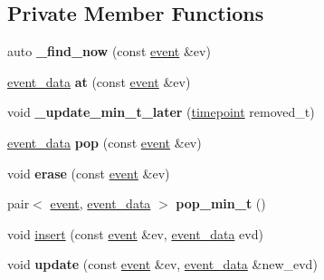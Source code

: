 \subsection*{Private Member Functions}
\begin{DoxyCompactItemize}
\item 
\mbox{\label{classschedule__t_acdc4eb553d3b3d32370e481e09648f91}} 
auto {\bfseries \+\_\+find\+\_\+now} (const \hyperlink{structtricl_1_1event}{event} \&ev)
\item 
\mbox{\label{classschedule__t_a985f7458ec7678df8ce215a6b62b4053}} 
\hyperlink{structtricl_1_1event__data}{event\+\_\+data} {\bfseries at} (const \hyperlink{structtricl_1_1event}{event} \&ev)
\item 
\mbox{\label{classschedule__t_a94dab3fd361972d4d3fd1ca5f1bc1ba1}} 
void {\bfseries \+\_\+update\+\_\+min\+\_\+t\+\_\+later} (\hyperlink{namespacetricl_a720ff6a29f998e11e1d3622fc8df64b1}{timepoint} removed\+\_\+t)
\item 
\mbox{\label{classschedule__t_a2f13d5051ff82db3127c7724bfdd84fa}} 
\hyperlink{structtricl_1_1event__data}{event\+\_\+data} {\bfseries pop} (const \hyperlink{structtricl_1_1event}{event} \&ev)
\item 
\mbox{\label{classschedule__t_ae0ef4c8aff56a3e48aa03289064eb0b8}} 
void {\bfseries erase} (const \hyperlink{structtricl_1_1event}{event} \&ev)
\item 
\mbox{\label{classschedule__t_abf71e35ffdc8ef4e9d63d371532a3444}} 
pair$<$ \hyperlink{structtricl_1_1event}{event}, \hyperlink{structtricl_1_1event__data}{event\+\_\+data} $>$ {\bfseries pop\+\_\+min\+\_\+t} ()
\item 
void \hyperlink{classschedule__t_ac103ad35f9b65078b79746a504f82287}{insert} (const \hyperlink{structtricl_1_1event}{event} \&ev, \hyperlink{structtricl_1_1event__data}{event\+\_\+data} evd)
\item 
\mbox{\label{classschedule__t_a1e2fab403a79b617d5db6f0d30c8e0af}} 
void {\bfseries update} (const \hyperlink{structtricl_1_1event}{event} \&ev, \hyperlink{structtricl_1_1event__data}{event\+\_\+data} \&new\+\_\+evd)
\end{DoxyCompactItemize}
